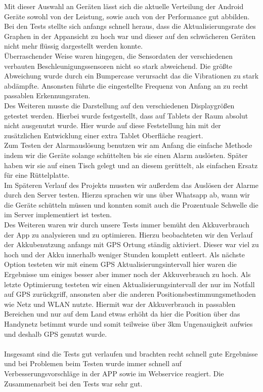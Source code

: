Mit dieser Auswahl an Geräten lässt sich die aktuelle Verteilung der Android Geräte sowohl von der Leistung, sowie auch von der Performance gut abbilden. Bei den Tests stellte sich anfangs schnell heraus, dass die Aktualisierungsrate des Graphen in der Appansicht zu hoch war und dieser auf den schwächeren Geräten nicht mehr flüssig dargestellt werden konnte.\\
Überraschender  Weise waren hingegen, die Sensordaten der verschiedenen verbauten Beschleunigungssensoren nicht so stark abweichend. Die größte Abweichung wurde durch ein Bumpercase verursacht das die Vibrationen zu stark abdämpfte. Ansonsten führte die eingestellte Frequenz von Anfang an zu recht passablen Erkennungsraten.\\
Des Weiteren musste die Darstellung auf den verschiedenen Displaygrößen getestet werden. Hierbei wurde festgestellt, dass auf Tablets der Raum absolut nicht ausgenutzt wurde. Hier wurde auf diese Feststellung hin mit der zusätzlichen Entwicklung einer extra Tablet Oberfläche reagiert.\\
Zum Testen der Alarmauslösung benutzen wir am Anfang die einfache Methode indem wir die Geräte solange schüttelten bis sie einen Alarm auslösten. Später haben wir sie auf einen Tisch gelegt und an diesem gerüttelt, als einfachen Ersatz für eine Rüttelplatte.\\
Im Späteren Verlauf des Projekts mussten wir außerdem das Auslösen der Alarme durch den Server testen. Hierzu sprachen wir uns über Whatsapp ab, wann wir die Geräte schütteln müssen und konnten somit auch die Prozentuale Schwelle die im Server implementiert ist testen.\\
Des Weiteren waren wir durch unsere Tests immer bemüht den Akkuverbrauch der App zu analysieren und zu optimieren. Hierzu beobachteten wir den Verlauf der Akkubenutzung anfangs mit GPS Ortung ständig aktiviert. Dieser war viel zu hoch und der Akku innerhalb weniger Stunden komplett entleert. Als nächste Option testeten wir mit einem GPS Aktualisierungsintervall hier waren die Ergebnisse um einiges besser aber immer noch der Akkuverbrauch zu hoch. Als letzte Optimierung testeten wir einen Aktualisierungsintervall der nur im Notfall auf GPS zurückgriff, ansonsten aber die anderen Positionsbestimmungsmethoden wie Netz und WLAN nutzte. Hiermit war der Akkuverbrauch in passablen Bereichen und nur auf dem Land etwas erhöht da hier die Position über das Handynetz betimmt wurde und somit teilweise über 3km Ungenauigkeit aufwies und deshalb GPS genutzt wurde.\\
\\
Insgesamt sind die Tests gut verlaufen und brachten recht schnell gute Ergebnisse und bei Problemen beim Testen wurde immer schnell auf Verbesserungsvorschläge in der APP sowie im Webservice reagiert. Die Zusammenarbeit bei den Tests war sehr gut.